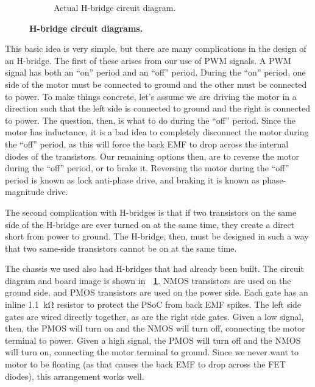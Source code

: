 \documentclass[letterpaper, 11pt]{article}
\newcommand*{\figref}[1]{\textbf{\figurename~\ref{#1}}}
\begin{document}
\begin{enumerate}[label=\textbf{\arabic*.}]
\begin{figure}[ht]
\begin{subfigure}[t]{0.48\textwidth}
        \caption{Actual H-bridge circuit diagram.}
        \label{fig:hb-circuit}
    \end{subfigure}
    \caption{\textbf{H-bridge circuit diagrams.}}
    \label{fig:hbridge}
\end{figure}

This basic idea is very simple, but there are many complications in the design of an H-bridge. The first of these arises from our use of PWM signals. A PWM signal has both an ``on'' period and an ``off'' period. During the ``on'' period, one side of the motor must be connected to ground and the other must be connected to power. To make things concrete, let's assume we are driving the motor in a direction such that the left side is connected to ground and the right is connected to power. The question, then, is what to do during the ``off'' period. Since the motor has inductance, it is a bad idea to completely disconnect the motor during the ``off'' period, as this will force the back EMF to drop across the internal diodes of the transistors. Our remaining options then, are to reverse the motor during the ``off'' period, or to brake it. Reversing the motor during the ``off'' period is known as lock anti-phase drive, and braking it is known as phase-magnitude drive.

The second complication with H-bridges is that if two transistors on the same side of the H-bridge are ever turned on at the same time, they create a direct short from power to ground. The H-bridge, then, must be designed in such a way that two same-side transistors cannot be on at the same time.

The chassis we used also had H-bridges that had already been built. The circuit diagram and board image is shown in \figref{fig:hb-circuit}. NMOS transistors are used on the ground side, and PMOS transistors are used on the power side. Each gate has an inline \SI{1.1}{\kilo\ohm} resistor to protect the PSoC from back EMF spikes. The left side gates are wired directly together, as are the right side gates. Given a low signal, then, the PMOS will turn on and the NMOS will turn off, connecting the motor terminal to power. Given a high signal, the PMOS will turn off and the NMOS will turn on, connecting the motor terminal to ground. Since we never want to motor to be floating (as that causes the back EMF to drop across the FET diodes), this arrangement works well.


\end{enumerate}
\end{document}
